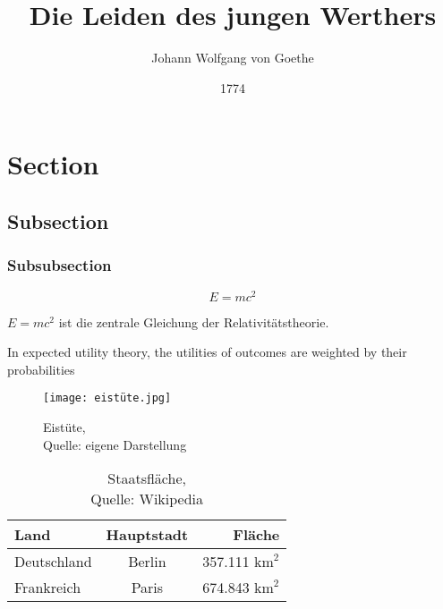 \documentclass[12pt,titlepage]{article}
\begin{document}

\begin{titlepage}
    \title{Die Leiden des jungen Werthers}
    \date{1774}
    \author{Johann Wolfgang von Goethe}
    \maketitle
\end{titlepage}

\tableofcontents
\newpage


\section{Section}
\subsection{Subsection}
\subsubsection{Subsubsection}

\begin{equation}
    E = mc^2
\end{equation}

$E = mc^2$ ist die zentrale Gleichung der Relativitätstheorie.

In expected utility theory, the utilities of outcomes are weighted by their probabilities

\newpage
\begin{figure}
	\centering\texttt{[image: eistüte.jpg]}
	\caption[Eistüte]{Eistüte,\\ Quelle: eigene Darstellung}
\end{figure}


\begin{table}
\centering
\begin{tabular}{lcr} 
\midrule 
Land & Hauptstadt & Fläche
\\ \toprule 
Deutschland & Berlin & 357.111 $\mbox{km}^2$\\
Frankreich & Paris & 674.843 $\mbox{km}^2$\\ 
\midrule 
\end{tabular}

\caption{Staatsfläche,\\ Quelle: Wikipedia}
\end{table}

%
%
\newpage
{}
\printbibliography

\newpage
{}
\listoffigures

\newpage
{}
\listoftables
\end{document}
